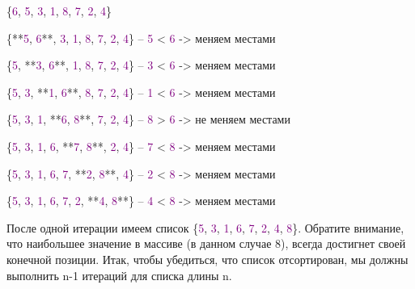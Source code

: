 \begin{tcolorbox} 
\{\textcolor{Purple}{6}, \textcolor{Purple}{5}, \textcolor{Purple}{3}, \textcolor{Purple}{1}, \textcolor{Purple}{8}, \textcolor{Purple}{7}, \textcolor{Purple}{2}, \textcolor{Purple}{4}\}

\{**\textcolor{Purple}{5}, \textcolor{Purple}{6}**, \textcolor{Purple}{3}, \textcolor{Purple}{1}, \textcolor{Purple}{8}, \textcolor{Purple}{7}, \textcolor{Purple}{2}, \textcolor{Purple}{4}\} -- \textcolor{Purple}{5} < \textcolor{Purple}{6} -> меняем местами

\{\textcolor{Purple}{5}, **\textcolor{Purple}{3}, \textcolor{Purple}{6}**, \textcolor{Purple}{1}, \textcolor{Purple}{8}, \textcolor{Purple}{7}, \textcolor{Purple}{2}, \textcolor{Purple}{4}\} -- \textcolor{Purple}{3} < \textcolor{Purple}{6} -> меняем местами

\{\textcolor{Purple}{5}, \textcolor{Purple}{3}, **\textcolor{Purple}{1}, \textcolor{Purple}{6}**, \textcolor{Purple}{8}, \textcolor{Purple}{7}, \textcolor{Purple}{2}, \textcolor{Purple}{4}\} -- \textcolor{Purple}{1} < \textcolor{Purple}{6} -> меняем местами

\{\textcolor{Purple}{5}, \textcolor{Purple}{3}, \textcolor{Purple}{1}, **\textcolor{Purple}{6}, \textcolor{Purple}{8}**, \textcolor{Purple}{7}, \textcolor{Purple}{2}, \textcolor{Purple}{4}\} -- \textcolor{Purple}{8} > \textcolor{Purple}{6} -> не меняем местами

\{\textcolor{Purple}{5}, \textcolor{Purple}{3}, \textcolor{Purple}{1}, \textcolor{Purple}{6}, **\textcolor{Purple}{7}, \textcolor{Purple}{8}**, \textcolor{Purple}{2}, \textcolor{Purple}{4}\} -- \textcolor{Purple}{7} < \textcolor{Purple}{8} -> меняем местами

\{\textcolor{Purple}{5}, \textcolor{Purple}{3}, \textcolor{Purple}{1}, \textcolor{Purple}{6}, \textcolor{Purple}{7}, **\textcolor{Purple}{2}, \textcolor{Purple}{8}**, \textcolor{Purple}{4}\} -- \textcolor{Purple}{2} < \textcolor{Purple}{8} -> меняем местами

\{\textcolor{Purple}{5}, \textcolor{Purple}{3}, \textcolor{Purple}{1}, \textcolor{Purple}{6}, \textcolor{Purple}{7}, \textcolor{Purple}{2}, **\textcolor{Purple}{4}, \textcolor{Purple}{8}**\} -- \textcolor{Purple}{4} < \textcolor{Purple}{8} -> меняем местами
\end{tcolorbox}

\vspace{\baselineskip}

После одной итерации имеем список \{\textcolor{Purple}{5}, \textcolor{Purple}{3}, \textcolor{Purple}{1}, \textcolor{Purple}{6}, \textcolor{Purple}{7}, \textcolor{Purple}{2}, \textcolor{Purple}{4}, \textcolor{Purple}{8}\}. Обратите внимание, что наибольшее значение в массиве (в данном случае 8), всегда достигнет своей конечной позиции. Итак, чтобы убедиться, что список отсортирован, мы должны выполнить n-1 итераций для списка длины n.

